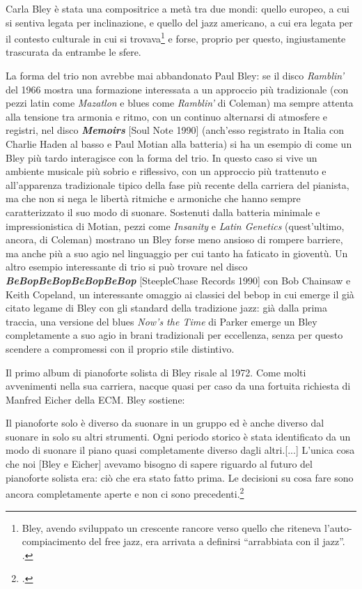 Carla Bley è stata una compositrice a metà tra due mondi: quello europeo, a cui si sentiva legata per inclinazione, e quello del jazz americano, a cui era legata per il contesto culturale in cui si trovava\footnote{Bley, avendo sviluppato un crescente rancore verso quello che riteneva l'auto-compiacimento del free jazz, era arrivata a definirsi ``arrabbiata con il jazz''. \cite[34]{carla}.} e forse, proprio per questo, ingiustamente trascurata da entrambe le sfere.\par
La forma del trio non avrebbe mai abbandonato Paul Bley: se il disco \textit{Ramblin'} del 1966 mostra una formazione interessata a un approccio più tradizionale (con pezzi latin come \textit{Mazatlon} e blues come \textit{Ramblin'} di Coleman) ma sempre attenta alla tensione tra armonia e ritmo, con un continuo alternarsi di atmosfere e registri, nel disco \textit{\textbf{Memoirs}} [Soul Note 1990] (anch'esso registrato in Italia con Charlie Haden al basso e Paul Motian alla batteria) si ha un esempio di come un Bley più tardo interagisce con la forma del trio. In questo caso si vive un ambiente musicale più sobrio e riflessivo, con un approccio più trattenuto e all'apparenza tradizionale tipico della fase più recente della carriera del pianista, ma che non si nega le libertà ritmiche e armoniche che hanno sempre caratterizzato il suo modo di suonare. Sostenuti dalla batteria minimale e impressionistica di Motian, pezzi come \textit{Insanity} e \textit{Latin Genetics} (quest'ultimo, ancora, di Coleman) mostrano un Bley forse meno ansioso di rompere barriere, ma anche più a suo agio nel linguaggio per cui tanto ha faticato in gioventù. Un altro esempio interessante di trio si può trovare nel disco \textbf{\textit{BeBopBeBopBeBopBeBop}} [SteepleChase Records 1990] con Bob Chainsaw e Keith Copeland, un interessante omaggio ai classici del bebop in cui emerge il già citato legame di Bley con gli standard della tradizione jazz: già dalla prima traccia, una versione del blues \textit{Now's the Time} di Parker emerge un Bley completamente a suo agio in brani tradizionali per eccellenza, senza per questo scendere a compromessi con il proprio stile distintivo.\par
Il primo album di pianoforte solista di Bley risale al 1972. Come molti avvenimenti nella sua carriera, nacque quasi per caso da una fortuita richiesta di Manfred Eicher della ECM. Bley sostiene:
\begin{fquote}
	Il pianoforte solo è diverso da suonare in un gruppo ed è anche diverso dal suonare in solo su altri strumenti. Ogni periodo storico è stata identificato da un modo di suonare il piano quasi completamente diverso dagli altri.[...] L'unica cosa che noi [Bley e Eicher] avevamo bisogno di sapere riguardo al futuro del pianoforte solista era: ciò che era stato fatto prima. Le decisioni su cosa fare sono ancora completamente aperte e non ci sono precedenti.\footcite[154]{stopping}
\end{fquote}
